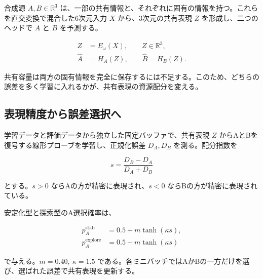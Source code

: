 \documentclass[11pt,a4paper]{ltjsarticle}
\begin{document}
合成源 $A,B\in\mathbb R^3$ は、一部の共有情報と、それぞれに固有の情報を持つ。これらを直交変換で混合した6次元入力 $X$ から、3次元の共有表現 $Z$ を形成し、二つのヘッドで $A$ と $B$ を予測する。

\begin{align}
Z &= E_\omega(X), \qquad Z\in\mathbb R^3,\\
\widehat A &= H_A(Z),\qquad \widehat B=H_B(Z).
\end{align}

共有容量は両方の固有情報を完全に保存するには不足する。このため、どちらの誤差を多く学習に入れるかが、共有表現の資源配分を変える。

\subsection{表現精度から誤差選択へ}

学習データと評価データから独立した固定バッファで、共有表現 $Z$ からAとBを復号する線形プローブを学習し、正規化誤差 $D_A,D_B$ を測る。配分指数を

\begin{equation}
s=\frac{D_B-D_A}{D_A+D_B}
\end{equation}

とする。$s>0$ ならAの方が精密に表現され、$s<0$ ならBの方が精密に表現されている。

安定化型と探索型のA選択確率は、

\begin{align}
p_A^{\mathrm{stab}} &= 0.5+m\tanh(\kappa s),\\
p_A^{\mathrm{explore}} &= 0.5-m\tanh(\kappa s)
\end{align}

で与える。$m=0.40,\ \kappa=1.5$ である。各ミニバッチではAかBの一方だけを選び、選ばれた誤差で共有表現を更新する。

\begin{center}
\end{center}
\end{document}
